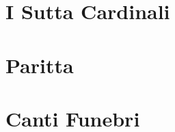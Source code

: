 \suttasPartSettings

\part{I Sutta Cardinali}

\suttasChapterSettings



\suttasSettingsRestore

\parittasPartSettings

\part{Paritta}

\parittasChapterSettings



\parittasSettingsRestore

\funeralPartSettings

\part{Canti Funebri}

\funeralChapterSettings



\funeralSettingsRestore

